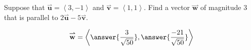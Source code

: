 \documentclass{ximera}
\author{Jim Talamo}
\begin{document}
\begin{exercise}
Suppose that $\overset{\boldsymbol{\rightharpoonup}}{\mathbf{u}} = \left\langle 3,-1 \right\rangle$ and $\overset{\boldsymbol{\rightharpoonup}}{\mathbf{v}} = \left\langle 1,1 \right\rangle$.  Find a vector $\overset{\boldsymbol{\rightharpoonup}}{\mathbf{w}}$ of magnitude $3$ that is parallel to $2\overset{\boldsymbol{\rightharpoonup}}{\mathbf{u}}-5\overset{\boldsymbol{\rightharpoonup}}{\mathbf{v}}$.

\[
\overset{\boldsymbol{\rightharpoonup}}{\mathbf{w}} = \left\langle \answer{\frac{3}{\sqrt{50}} }, \answer{ \frac{-21}{\sqrt{50}} } \right\rangle
\]

\end{exercise}
\end{document}
